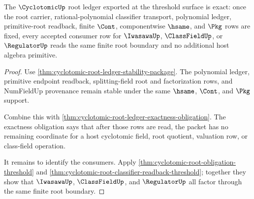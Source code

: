 \begin{theorem}
\label{thm:cyclotomic-root-ledger-exactness-threshold}
The $\CyclotomicUp$ root ledger exported at the threshold surface is exact: once
the root carrier, rational-polynomial classifier transport, polynomial ledger,
primitive-root readback, finite $\Cont$, componentwise $\hsame$, and $\Pkg$
rows are fixed, every accepted consumer row for $\IwasawaUp$, $\ClassFieldUp$,
or $\RegulatorUp$ reads the same finite root boundary and no additional host
algebra primitive.
\end{theorem}
\begin{proof}
Use \autoref{thm:cyclotomic-root-ledger-stability-package}. The polynomial
ledger, primitive endpoint readback, splitting-field root and factorization
rows, and NumFieldUp provenance remain stable under the same $\hsame$, $\Cont$,
and $\Pkg$ support.

Combine this with \autoref{thm:cyclotomic-root-ledger-exactness-obligation}.
The exactness obligation says that after those rows are read, the packet has no
remaining coordinate for a host cyclotomic field, root quotient, valuation row,
or class-field operation.

It remains to identify the consumers. Apply
\autoref{thm:cyclotomic-root-obligation-threshold} and
\autoref{thm:cyclotomic-root-classifier-readback-threshold}; together they show
that $\IwasawaUp$, $\ClassFieldUp$, and $\RegulatorUp$ all factor through the
same finite root boundary.
\end{proof}

